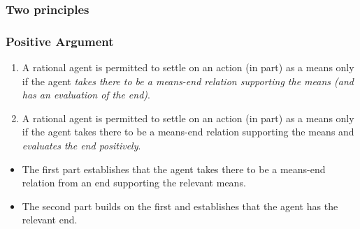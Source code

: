 \documentclass[noamssymb,
]{beamer} %
\newcommand{\hozlinedash}[0]{
  \noindent\hdashrule[0.5ex][c]{\textwidth}{.1pt}{2.5pt}
}
\begin{document}
\subsubsection{Two principles}
\label{sec:two-principles}

\begin{frame}
    \frametitle{Positive Argument}

    \begin{enumerate}
    \item A rational agent is permitted to settle on an action (in part) as a means only if the agent \emph{takes there to be a means-end relation supporting the means (and has an evaluation of the end)}.
    \item A rational agent is permitted to settle on an action (in part) as a means only if the agent takes there to be a means-end relation supporting the means and \emph{evaluates the end positively}.
    \end{enumerate}
    \begin{itemize}
    \item The first part establishes that the agent takes there to be a means-end relation from an end supporting the relevant means.
    \item The second part builds on the first and establishes that the agent has the relevant end.
    \end{itemize}

\end{frame}
\end{document}
